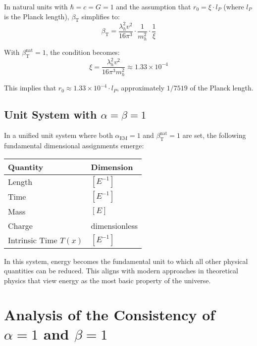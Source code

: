 \documentclass[12pt,a4paper]{article}
\newcommand{\Tfield}{T(x)}
\newcommand{\alphaEM}{\alpha_{\text{EM}}}
\newcommand{\betaT}{\beta_{\text{T}}}
\begin{document}
	In natural units with \(\hbar = c = G = 1\) and the assumption that \(r_0 = \xi \cdot l_P\) (where \(l_P\) is the Planck length), \(\betaT\) simplifies to:
	\begin{equation}
		\betaT = \frac{\lambda_h^2 v^2}{16\pi^3} \cdot \frac{1}{m_h^2} \cdot \frac{1}{\xi}
	\end{equation}
	
	With \(\betaT^{\text{nat}} = 1\), the condition becomes:
	\begin{equation}
		\xi = \frac{\lambda_h^2 v^2}{16\pi^3 m_h^2} \approx 1.33 \times 10^{-4}
	\end{equation}
	
	This implies that \(r_0 \approx 1.33 \times 10^{-4} \cdot l_P\), approximately \(1/7519\) of the Planck length.
	
	\subsection{Unit System with \(\alpha = \beta = 1\)}
	
	In a unified unit system where both \(\alphaEM = 1\) and \(\betaT^{\text{nat}} = 1\) are set, the following fundamental dimensional assignments emerge:
	
	\begin{tcolorbox}[colback=blue!5!white,colframe=blue!75!black,title=Dimensional Assignments in the Unified Unit System]
		\begin{tabular}{ll}
			\textbf{Quantity} & \textbf{Dimension} \\
			\hline
			Length & \([E^{-1}]\) \\
			Time & \([E^{-1}]\) \\
			Mass & \([E]\) \\
			Charge & dimensionless \\
			Intrinsic Time \(\Tfield\) & \([E^{-1}]\) \\
		\end{tabular}
	\end{tcolorbox}
	
	In this system, energy becomes the fundamental unit to which all other physical quantities can be reduced. This aligns with modern approaches in theoretical physics that view energy as the most basic property of the universe.
	
	\section{Analysis of the Consistency of \(\alpha = 1\) and \(\beta = 1\)}
	
\end{document}

